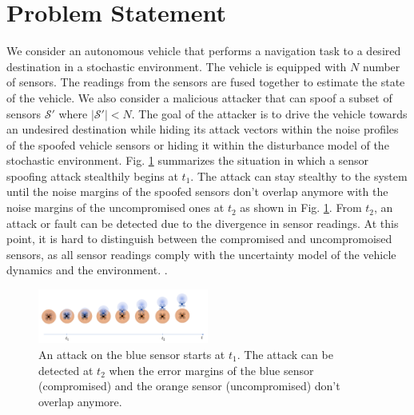 \documentclass[letterpaper, 10 pt, conference]{ieeeconf}  %
\begin{document}
\section{Problem Statement}\label{sec:problem}
We consider an autonomous vehicle that performs a navigation task to a desired destination in a stochastic environment. The vehicle is equipped with $N$ number of sensors. The readings from the sensors are fused together to estimate the state of the vehicle. We also consider a malicious attacker that can spoof a subset of sensors $\mathcal{S'}$ where $|\mathcal{S'}| < N$. The goal of the attacker is to drive the vehicle towards an undesired destination while hiding its attack vectors within the noise profiles of the spoofed vehicle sensors or hiding it within the disturbance model of the stochastic environment.  Fig. \ref{fig:sensor_spoofing} summarizes the situation in which a sensor spoofing attack stealthily begins at $t_1$. The attack can stay stealthy to the system until the noise margins of the spoofed sensors don't overlap anymore with the noise margins of the uncompromised ones at $t_2$ as shown in Fig. \ref{fig:sensor_spoofing}. From $t_2$, an attack or fault can be detected due to the divergence in sensor readings. At this point, it is hard to distinguish between the compromised and uncompromoised sensors, as all sensor readings comply with the uncertainty model of the vehicle dynamics and the environment. .
\begin{figure}[h]
\centering
\includegraphics[width=0.5\textwidth]{sensor_spoofing}
\caption{An attack on the blue sensor starts at $t_1$. The attack can be detected at $t_2$ when the error margins of the blue sensor (compromised) and the orange sensor (uncompromised) don't overlap anymore.}
 \label{fig:sensor_spoofing}
\end{figure}
\end{document}
